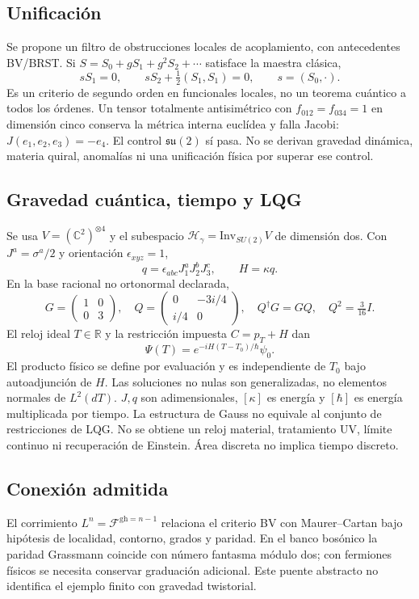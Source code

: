 \documentclass[11pt,a4paper]{article}
\begin{document}
\subsection{Unificación}
Se propone un filtro de obstrucciones locales de acoplamiento, con antecedentes
BV/BRST. Si $S=S_0+gS_1+g^2S_2+\cdots$ satisface la maestra clásica,
\[
 s S_1=0,\qquad sS_2+\tfrac12(S_1,S_1)=0,\qquad s=(S_0,\cdot).
\]
Es un criterio de segundo orden en funcionales locales, no un teorema cuántico
a todos los órdenes. Un tensor totalmente antisimétrico con $f_{012}=f_{034}=1$
en dimensión cinco conserva la métrica interna euclídea y falla Jacobi:
$J(e_1,e_2,e_3)=-e_4$. El control $\mathfrak{su}(2)$ sí pasa.
No se derivan gravedad dinámica, materia quiral, anomalías ni una unificación
física por superar ese control.

\subsection{Gravedad cuántica, tiempo y LQG}
Se usa $V=(\mathbb C^2)^{\otimes4}$ y el subespacio
$\mathcal H_\gamma=\mathrm{Inv}_{SU(2)}V$ de dimensión dos. Con
$J^a=\sigma^a/2$ y orientación $\epsilon_{xyz}=1$,
\[
 q=\epsilon_{abc}J_1^aJ_2^bJ_3^c,\qquad H=\kappa q.
\]
En la base racional no ortonormal declarada,
\[
 G=\begin{pmatrix}1&0\\0&3\end{pmatrix},\quad
 Q=\begin{pmatrix}0&-3i/4\\i/4&0\end{pmatrix},\quad
 Q^\dagger G=GQ,\quad Q^2=\tfrac3{16}I.
\]
El reloj ideal $T\in\mathbb R$ y la restricción impuesta $C=p_T+H$ dan
\[
 \Psi(T)=e^{-iH(T-T_0)/\hbar}\psi_0.
\]
El producto físico se define por evaluación y es independiente de $T_0$ bajo
autoadjunción de $H$. Las soluciones no nulas son generalizadas, no elementos
normales de $L^2(dT)$. $J,q$ son adimensionales, $[\kappa]$ es energía y
$[\hbar]$ es energía multiplicada por tiempo. La estructura de Gauss no equivale al conjunto
de restricciones de LQG. No se obtiene un reloj material, tratamiento UV,
límite continuo ni recuperación de Einstein. Área discreta no implica tiempo
discreto.

\subsection{Conexión admitida}
El corrimiento $L^n=\mathcal F^{\mathrm{gh}=n-1}$ relaciona el criterio BV con
Maurer--Cartan bajo hipótesis de localidad, contorno, grados y paridad. En el
banco bosónico la paridad Grassmann coincide con número fantasma módulo dos;
con fermiones físicos se necesita conservar graduación adicional. Este puente
abstracto no identifica el ejemplo finito con gravedad twistorial.
\end{document}
